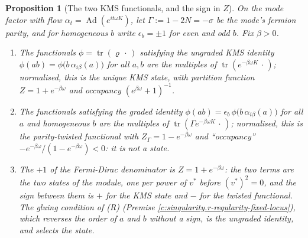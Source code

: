 \documentclass[11pt]{article}
\newtheorem{proposition}[theorem]{Proposition}
\theoremstyle{definition}
\theoremstyle{plain}
\providecommand{\tr}{}\renewcommand{\tr}{\operatorname{tr}}
\begin{document}
\begin{proposition}[The two KMS functionals, and the sign in $Z$]\label{c:singularity.two-kms-functionals-sign}
On the mode factor with flow $\alpha_t = \operatorname{Ad}(e^{it\omega K})$, let $\Gamma := 1 - 2N = -\sigma$ be the mode's fermion parity, and for homogeneous $b$ write $\epsilon_b = \pm 1$ for even and odd $b$. Fix $\beta > 0$.
\begin{enumerate}
\item The functionals $\phi = \tr(\varrho\,\cdot\,)$ satisfying the \emph{ungraded} KMS identity $\phi(ab) = \phi\bigl(b\,\alpha_{i\beta}(a)\bigr)$ for all $a, b$ are the multiples of $\tr(e^{-\beta\omega K}\,\cdot\,)$; normalised, this is the unique KMS state, with partition function $Z = 1 + e^{-\beta\omega}$ and occupancy $(e^{\beta\omega} + 1)^{-1}$.
\item The functionals satisfying the \emph{graded} identity $\phi(ab) = \epsilon_b\,\phi\bigl(b\,\alpha_{i\beta}(a)\bigr)$ for all $a$ and homogeneous $b$ are the multiples of $\tr(\Gamma e^{-\beta\omega K}\,\cdot\,)$; normalised, this is the parity-twisted functional with $Z_\Gamma = 1 - e^{-\beta\omega}$ and ``occupancy'' $-e^{-\beta\omega}/(1 - e^{-\beta\omega}) < 0$: it is not a state.
\item The $+1$ of the Fermi-Dirac denominator is $Z = 1 + e^{-\beta\omega}$: the two terms are the two states of the module, one per power of $v^{*}$ before $(v^{*})^{2} = 0$, and the sign between them is $+$ for the KMS state and $-$ for the twisted functional. The gluing condition of (R) (Premise \ref{c:singularity.r-regularity-fixed-locus}), which reverses the order of $a$ and $b$ without a sign, is the ungraded identity, and selects the state.
\end{enumerate}
\end{proposition}
\end{document}
